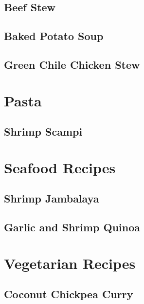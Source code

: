 \documentclass{report}
\begin{document}
\section{Beef Stew}

\newpage 
\section{Baked Potato Soup}

\newpage 


\section{Green Chile Chicken Stew}


\chapter{Pasta}
\newpage

\section{Shrimp Scampi}


\chapter{Seafood Recipes}
\newpage

\section{Shrimp Jambalaya}

\newpage


\section{Garlic and Shrimp Quinoa}


\chapter{Vegetarian Recipes}
\newpage 
\section{Coconut Chickpea Curry}

\newpage 
%
\end{document}
